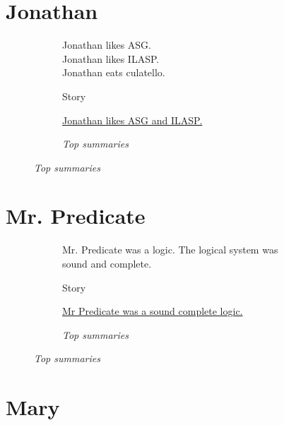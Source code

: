 \section*{Jonathan}

\begin{figure}[H]
\begin{subfigure}{0.45\textwidth}
\begin{displayquote}
Jonathan likes ASG.\\
Jonathan likes ILASP.\\
Jonathan eats culatello.
\end{displayquote}
\caption{Story}
\end{subfigure}
\begin{subfigure}{0.55\textwidth}
\begin{displayquote}
\underline{Jonathan likes ASG and ILASP.}
\end{displayquote}
\caption{\textit{Top summaries}}
\end{subfigure}
\end{figure}

\section*{Mr. Predicate}

\begin{figure}[H]
\begin{subfigure}{\textwidth}
\begin{displayquote}
Mr. Predicate was a logic. The logical system was sound and complete.
\end{displayquote}
\caption{Story}
\end{subfigure}
\begin{subfigure}{\textwidth}
\begin{displayquote}
\item \underline{Mr Predicate was a sound complete logic.}
\end{displayquote}
\caption{\textit{Top summaries}}
\end{subfigure}
\end{figure}

\section*{Mary}

